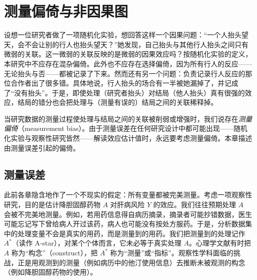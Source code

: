 \chapter{测量偏倚与非因果图}

\newcommand{\measbase}{%
  \node[wvtx] (A)  at (0,0)       {$A$};
  \node[wvtx] (Ap) at (0,1.15)    {$A^{*}$};
  \node[wlat] (UA) at (0,2.3)     {$U_A$};
  \node[wvtx] (Y)  at (3.3,0)     {$Y$};
  \node[wvtx] (Yp) at (3.3,1.15)  {$Y^{*}$};
  \node[wlat] (UY) at (3.3,2.3)   {$U_Y$};
  \draw[ed] (UA) -- (Ap);
  \draw[ed] (Ap) -- (A);
  \draw[ed] (UY) -- (Yp);
  \draw[ed] (Yp) -- (Y);
  \draw[ed] (A) -- (Y);
}


设想一位研究者做了一项随机化实验，想回答这样一个因果问题：“一个人抬头望天，会不会让别的行人也抬头望天？”她发现，自己抬头与其他行人抬头之间只有微弱的关联。这一微弱的关联反映的是微弱的因果效应吗？按随机化实验的定义，本研究中不应存在混杂偏倚。此外也不应存在选择偏倚，因为所有行人的反应——无论抬头与否——都被记录了下来。然而还有另一个问题：负责记录行人反应的那位合作者出了很多错。具体地说，行人抬头的场合有一半被她漏掉了，并记成了“没有抬头”。于是，即使处理（研究者抬头）对结局（他人抬头）真有很强的效应，结局的错分也会把处理与（测量有误的）结局之间的关联稀释掉。

当研究数据的测量过程使处理与结局之间的关联被削弱或增强时，我们说存在\emph{测量偏倚}（measurement bias）。由于测量误差在任何研究设计中都可能出现——随机化实验与观察性研究皆然——解读效应估计值时，永远要考虑测量偏倚。本章描述由测量误差引起的偏倚。

\section{测量误差}

此前各章隐含地作了一个不现实的假定：所有变量都被完美测量。考虑一项观察性研究，目的是估计降胆固醇药物 $A$ 对肝病风险 $Y$ 的效应。我们往往预期处理 $A$ 会被不完美地测量。例如，若用药信息得自病历摘录，摘录者可能抄错数据，医生可能忘记写下曾给病人开过该药，病人也可能没有按处方服药。于是，分析数据集中的处理变量不会是真实的用药，而是测量到的用药。我们把测量到的处理记作 $A^{*}$（读作 A-star），对某个个体而言，它未必等于真实处理 $A$。心理学文献有时把 $A$ 称为“构念”（construct），把 $A^{*}$ 称为“测量”或“指标”。观察性学科面临的挑战，正是用观测到的测量（例如病历中的他汀使用信息）去推断未被观测的构念（例如降胆固醇药物的使用）。

